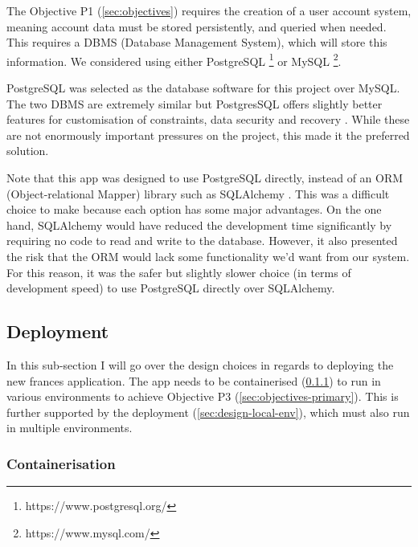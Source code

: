 \documentclass[12pt, letterpaper]{article}
\begin{document}
\begin{flushleft}
The Objective P1 (\ref{sec:objectives}) requires the creation of a user account system, meaning account data must be stored persistently, and queried when needed. This requires a DBMS (Database Management System), which will store this information. We considered using either PostgreSQL \footnote{https://www.postgresql.org/} or MySQL \footnote{https://www.mysql.com/}.
\end{flushleft}

\begin{flushleft}
PostgreSQL was selected as the database software for this project over MySQL. The two DBMS are extremely similar but PostgresSQL offers slightly better features for customisation of constraints, data security and recovery \cite{postgres}. While these are not enormously important pressures on the project, this made it the preferred solution.
\end{flushleft}

\begin{flushleft}
Note that this app was designed to use PostgreSQL directly, instead of an ORM (Object-relational Mapper) library such as SQLAlchemy \cite{sql-alchemy}. This was a difficult choice to make because each option has some major advantages. On the one hand, SQLAlchemy would have reduced the development time significantly by requiring no code to read and write to the database. However, it also presented the risk that the ORM would lack some functionality we'd want from our system. For this reason, it was the safer but slightly slower choice (in terms of development speed) to use PostgreSQL directly over SQLAlchemy.
\end{flushleft}

\subsection{Deployment}\label{sec:design-deployment}

\begin{flushleft}
In this sub-section I will go over the design choices in regards to deploying the new frances application. The app needs to be containerised (\ref{sec:design-containerisation})  to run in various environments to achieve Objective P3 (\ref{sec:objectives-primary}). This is further supported by the deployment (\ref{sec:design-local-env}), which must also run in multiple environments. 
\end{flushleft}
 
\subsubsection{Containerisation}\label{sec:design-containerisation}
\end{document}
